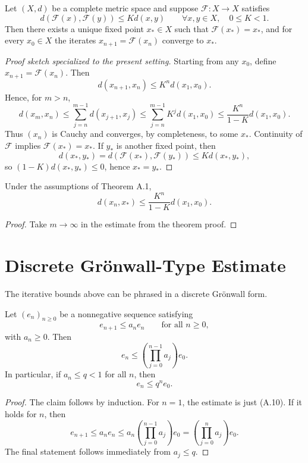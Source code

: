 \documentclass[11pt]{article}
\begin{document}
\begin{theorem}
Let $(X,d)$ be a complete metric space and suppose $\mathcal{F}:X\to X$ satisfies
\[
d(\mathcal{F}(x),\mathcal{F}(y)) \le K d(x,y) \qquad \forall x,y\in X, \quad 0\le K<1. \tag{A.8}
\]
Then there exists a unique fixed point $x_*\in X$ such that $\mathcal{F}(x_*)=x_*$, and for every $x_0\in X$ the iterates $x_{n+1}=\mathcal{F}(x_n)$ converge to $x_*$.
\end{theorem}

\begin{proof}[Proof sketch specialized to the present setting]
Starting from any $x_0$, define $x_{n+1}=\mathcal{F}(x_n)$. Then
\[
d(x_{n+1},x_n) \le K^n d(x_1,x_0).
\]
Hence, for $m>n$,
\[
d(x_m,x_n) \le \sum_{j=n}^{m-1} d(x_{j+1},x_j)
\le \sum_{j=n}^{m-1} K^j d(x_1,x_0)
\le \frac{K^n}{1-K}d(x_1,x_0).
\]
Thus $(x_n)$ is Cauchy and converges, by completeness, to some $x_*$. Continuity of $\mathcal{F}$ implies $\mathcal{F}(x_*)=x_*$. If $y_*$ is another fixed point, then
\[
d(x_*,y_*)=d(\mathcal{F}(x_*),\mathcal{F}(y_*))\le K d(x_*,y_*),
\]
so $(1-K)d(x_*,y_*)\le 0$, hence $x_*=y_*$.
\end{proof}

\begin{corollary}
Under the assumptions of Theorem A.1,
\[
d(x_n,x_*) \le \frac{K^n}{1-K} d(x_1,x_0). \tag{A.9}
\]
\end{corollary}

\begin{proof}
Take $m\to\infty$ in the estimate from the theorem proof.
\end{proof}

\section{Discrete Gr\"onwall-Type Estimate}
The iterative bounds above can be phrased in a discrete Gr\"onwall form.

\begin{lemma}
Let $(e_n)_{n\ge 0}$ be a nonnegative sequence satisfying
\[
e_{n+1} \le a_n e_n \qquad \text{for all } n\ge 0, \tag{A.10}
\]
with $a_n\ge 0$. Then
\[
e_n \le \left(\prod_{j=0}^{n-1} a_j\right)e_0. \tag{A.11}
\]
In particular, if $a_n\le q<1$ for all $n$, then
\[
e_n \le q^n e_0. \tag{A.12}
\]
\end{lemma}

\begin{proof}
The claim follows by induction. For $n=1$, the estimate is just \textup{(A.10)}. If it holds for $n$, then
\[
e_{n+1} \le a_n e_n \le a_n\left(\prod_{j=0}^{n-1} a_j\right)e_0 = \left(\prod_{j=0}^{n} a_j\right)e_0.
\]
The final statement follows immediately from $a_j\le q$.
\end{proof}
\end{document}
